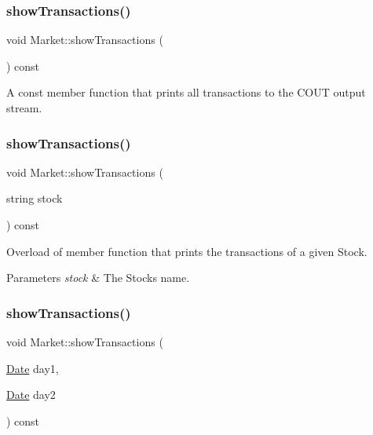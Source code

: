 \subsubsection{\texorpdfstring{show\+Transactions()}{showTransactions()}\hspace{0.1cm}{\footnotesize\ttfamily [1/4]}}
{\footnotesize\ttfamily void Market\+::show\+Transactions (\begin{DoxyParamCaption}{ }\end{DoxyParamCaption}) const}

A const member function that prints all transactions to the C\+O\+UT output stream. \hypertarget{class_market_a0e812e86e9c5585e845bf0cc3dbc3fed}{}\label{class_market_a0e812e86e9c5585e845bf0cc3dbc3fed} 
\subsubsection{\texorpdfstring{show\+Transactions()}{showTransactions()}\hspace{0.1cm}{\footnotesize\ttfamily [2/4]}}
{\footnotesize\ttfamily void Market\+::show\+Transactions (\begin{DoxyParamCaption}\item[{string}]{stock }\end{DoxyParamCaption}) const}

Overload of member function that prints the transactions of a given Stock. 
\begin{DoxyParams}{Parameters}
{\em stock} & The Stock\textquotesingle{}s name. \\
\hline
\end{DoxyParams}
\hypertarget{class_market_a52591efe5c3cf54723f5eff4f21f22f3}{}\label{class_market_a52591efe5c3cf54723f5eff4f21f22f3} 
\subsubsection{\texorpdfstring{show\+Transactions()}{showTransactions()}\hspace{0.1cm}{\footnotesize\ttfamily [3/4]}}
{\footnotesize\ttfamily void Market\+::show\+Transactions (\begin{DoxyParamCaption}\item[{\hyperlink{class_date}{Date}}]{day1,  }\item[{\hyperlink{class_date}{Date}}]{day2 }\end{DoxyParamCaption}) const}

